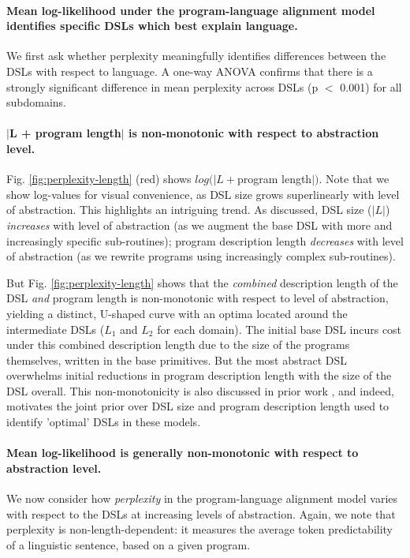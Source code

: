 \documentclass[10pt,letterpaper]{article}
\begin{document}
\paragraph{Mean log-likelihood under the program-language alignment model identifies specific DSLs which best explain language.} We first ask whether perplexity meaningfully identifies differences between the DSLs with respect to language. A one-way ANOVA confirms that there is a strongly significant difference in mean perplexity across DSLs (p $<$ 0.001) for all subdomains. 

\paragraph{$|$L + program length$|$ is non-monotonic with respect to abstraction level.} Fig. \ref{fig:perplexity-length} (red) shows $log(|L + $program length$|)$. Note that we show log-values for visual convenience, as DSL size grows superlinearly with level of abstraction. This highlights an intriguing trend. As discussed, DSL size ($|L|$) \textit{increases} with level of abstraction (as we augment the base DSL with more and increasingly specific sub-routines); program description length \textit{decreases} with level of abstraction (as we rewrite programs using increasingly complex sub-routines).

But Fig. \ref{fig:perplexity-length} shows that the \textit{combined} description length of the DSL \textit{and} program length is non-monotonic with respect to level of abstraction, yielding a distinct, U-shaped curve with an optima located around the intermediate DSLs ($L_1$ and $L_2$ for each domain). The initial base DSL incurs cost under this combined description length due to the size of the programs themselves, written in the base primitives. But the most abstract DSL overwhelms initial reductions in program description length with the size of the DSL overall. This non-monotonicity is also discussed in prior work , and indeed, motivates the joint prior over DSL size and program description length used to identify 'optimal' DSLs in these models.

\paragraph{Mean log-likelihood is generally non-monotonic with respect to abstraction level.} We now consider how \textit{perplexity} in the program-language alignment model varies with respect to the DSLs at increasing levels of abstraction. Again, we note that perplexity is non-length-dependent: it measures the average token predictability of a linguistic sentence, based on a given program. 
\end{document}
